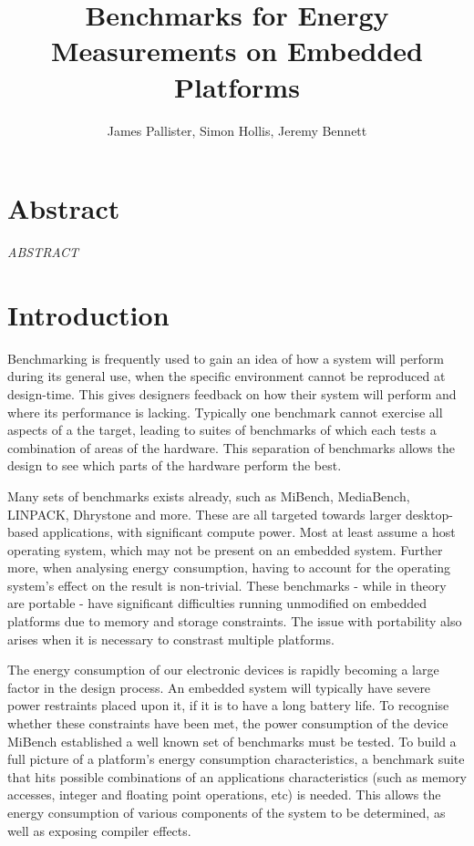 \documentclass[twocolumn]{article}
\title{Benchmarks for Energy Measurements on Embedded Platforms}
\author{James Pallister, Simon Hollis, Jeremy Bennett}
\begin{document}
\maketitle
\section*{Abstract}

\textit{ABSTRACT}

\section*{Introduction}

Benchmarking is frequently used to gain an idea of how a system will perform during its general use, when the specific environment cannot be reproduced at design-time. This gives designers feedback on how their system will perform and where its performance is lacking. Typically one benchmark cannot exercise all aspects of a the target, leading to suites of benchmarks of which each tests a combination of areas of the hardware. This separation of benchmarks allows the design to see which parts of the hardware perform the best.


Many sets of benchmarks exists already, such as MiBench\cite{MiBench}, MediaBench\cite{MediaBench}, LINPACK\cite{LINPACK}, Dhrystone\cite{Dhrystone} and more. These are all targeted towards larger desktop-based applications, with significant compute power. Most at least assume a host operating system, which may not be present on an embedded system. Further more, when analysing energy consumption, having to account for the operating system’s effect on the result is non-trivial. These benchmarks - while in theory are portable - have significant difficulties running unmodified on embedded platforms due to memory and storage constraints. The issue with portability also arises when it is necessary to constrast multiple platforms.

The energy consumption of our electronic devices is rapidly becoming a large factor in the design process. An embedded system will typically have severe power restraints placed upon it, if it is to have a long battery life. To recognise whether these constraints have been met, the power consumption of the device MiBench established a well known set of benchmarks must be tested. To build a full picture of a platform’s energy consumption characteristics, a benchmark suite that hits possible combinations of an applications characteristics (such as memory accesses, integer and floating point operations, etc) is needed. This allows the energy consumption of various components of the system to be determined, as well as exposing compiler effects.
\end{document}
